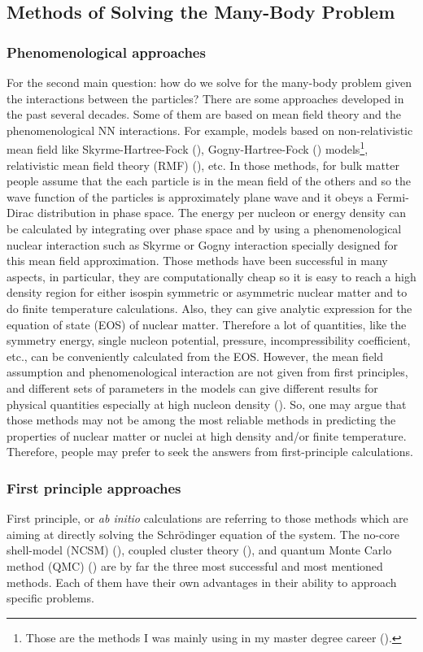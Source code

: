 \documentclass[12pt,letterpaper,UTF8]{report}
\begin{document}
\subsection{Methods of Solving the Many-Body Problem}
\subsubsection{Phenomenological approaches}
For the second main question: how do we solve for the many-body problem given the interactions between the particles?
There are some approaches developed in the past several decades.
Some of them are based on mean field theory and the phenomenological NN interactions. For example, models based on non-relativistic mean field like Skyrme-Hartree-Fock (\cite{SKYRME1958615}), Gogny-Hartree-Fock (\cite{Gogny1980PRC})  models\footnote{
Those are the methods I was mainly using in my master degree career (\cite{ChenRong2012PRC}).
},
relativistic mean field theory (RMF) (\cite{Reinhard_1989,RING1996193}), etc.
In those methods, for bulk matter people assume that the each particle is in the mean field of the others and so the wave function of the particles is approximately plane wave and it obeys a Fermi-Dirac distribution in phase space. The energy per nucleon or energy density can be calculated by integrating over phase space and by using a phenomenological nuclear interaction such as Skyrme or Gogny interaction specially designed for this mean field approximation.
Those methods have been successful in many aspects, in particular, they are computationally cheap so it is easy to reach a high density region for either isospin symmetric or asymmetric nuclear matter and to do finite temperature calculations. Also, they can give analytic expression for the equation of state (EOS) of nuclear matter. Therefore a lot of quantities, like the symmetry energy, single nucleon potential, pressure, incompressibility coefficient, etc.,  can be conveniently calculated from the EOS.
However, the mean field assumption and phenomenological interaction are not given from first principles, and different sets of parameters in the models can give different results for physical quantities especially at high nucleon density (\cite{LWChen2008a}). So, one may argue that those methods may not be among the most reliable methods in predicting the properties of nuclear matter or nuclei at high density and/or finite temperature.
Therefore, people may prefer to seek the answers from first-principle calculations.

\subsubsection{First principle approaches}
First principle, or \textit{ab initio} calculations are referring to those methods which are aiming at directly solving the Schr\"{o}dinger equation of the system. The no-core shell-model (NCSM) (\cite{Navr_til_2009,BARRETT2013131}), coupled cluster theory (\cite{Hagen_2014}), and quantum Monte Carlo method (QMC) (\cite{CarlsonRMP15a}) are by far the three most successful and most mentioned methods. Each of them have their own advantages in their ability to approach specific problems.
\end{document}
